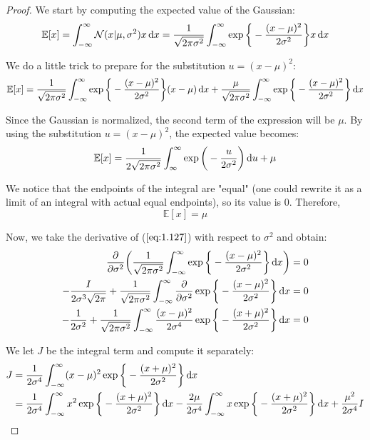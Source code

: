 \vspace{1em}
\begin{proof}
    We start by computing the expected value of the Gaussian:
    \[
        \mathbb{E}[x] = \int_{-\infty}^{\infty} \mathcal{N}(x | \mu, \sigma^2) x \mathop{}\!\mathrm{d} x
        = \frac{1}{\sqrt{2\pi\sigma^2}} \int_{-\infty}^{\infty} 
            \exp \bigg\{-\frac{(x - \mu)^2}{2\sigma^2}\bigg\} x \mathop{}\!\mathrm{d} x
    \] 

    We do a little trick to prepare for the substitution $u = (x - \mu)^2$:
    \[
        \mathbb{E}[x] = \frac{1}{\sqrt{2\pi\sigma^2}} \int_{-\infty}^{\infty} 
        \exp\bigg\{-\frac{(x - \mu)^2}{2\sigma^2}\bigg\} (x - \mu) \mathop{}\!\mathrm{d} x 
        + \frac{\mu}{\sqrt{2\pi\sigma^2}} \int_{-\infty}^{\infty} \exp\bigg\{-\frac{(x - \mu)^2}{2\sigma^2}\bigg\} \mathop{}\!\mathrm{d} x
    \] 

    Since the Gaussian is normalized, the second term of the expression will be $\mu$.
    By using the substitution $u = (x - \mu)^2$, the expected value becomes:
    \[
        \mathbb{E}[x] 
        = \frac{1}{2\sqrt{2\pi\sigma^2}} \int_{\infty}^{\infty} \exp\bigg(-\frac{u}{2\sigma^2}\bigg) \mathop{}\!\mathrm{d} u + \mu
    \] 

    We notice that the endpoints of the integral are "equal" (one could rewrite it as a
    limit of an integral with actual equal endpoints), so its value is 0. Therefore,
    \begin{equation*}
        \mathbb{E}[x] = \mu
        \tag{1.49}\label{eq:1.49}
    \end{equation*}

    Now, we take the derivative of ($\ref{eq:1.127}$) with respect to $\sigma^2$ and obtain:
    \begin{align*}
        \pdv{\sigma^2} \bigg(\frac{1}{\sqrt{2\pi \sigma^2}} 
        \int_{-\infty}^{\infty} \exp \bigg\{-\frac{(x - \mu)^2}{2\sigma^2}\bigg\} \mathop{}\!\mathrm{d} x\bigg) &= 0 \\
        -\frac{I}{2\sigma^3\sqrt{2\pi}} + 
        \frac{1}{\sqrt{2\pi\sigma^2}} \int_{-\infty}^{\infty} \pdv{\sigma^2} 
        \exp \bigg\{-\frac{(x - \mu)^2}{2\sigma^2}\bigg\} \mathop{}\!\mathrm{d} x &= 0 \\
        -\frac{1}{2\sigma^2} + 
        \frac{1}{\sqrt{2\pi\sigma^2}} \int_{-\infty}^{\infty}
        \frac{(x - \mu)^2}{2\sigma^4} \exp\bigg\{-\frac{(x + \mu)^2}{2\sigma^2}\bigg\} \mathop{}\!\mathrm{d} x &= 0
    \end{align*}

    We let $J$ be the integral term and compute it separately:
    \begin{align*}
        J &= \frac{1}{2\sigma^4} \int_{-\infty}^{\infty} (x - \mu)^2 \exp \bigg\{-\frac{(x + \mu)^2}{2\sigma^2}\bigg\} \mathop{}\!\mathrm{d} x \\
          &= \frac{1}{2\sigma^4} \int_{-\infty}^{\infty} x^2 
            \exp \bigg\{-\frac{(x+\mu)^2}{2\sigma^2}\bigg\} \mathop{}\!\mathrm{d} x
        - \frac{2\mu}{2\sigma^4} \int_{-\infty}^{\infty} x 
            \exp \bigg\{-\frac{(x+\mu)^2}{2\sigma^2}\bigg\} \mathop{}\!\mathrm{d} x
        + \frac{\mu^2}{2\sigma^4} I
    \end{align*}


\end{proof}
